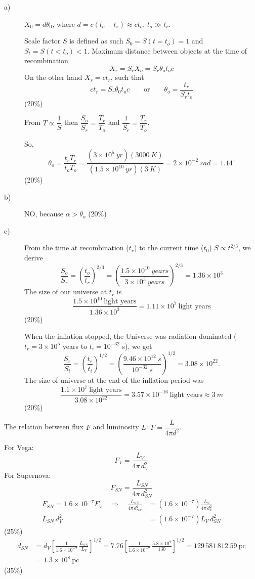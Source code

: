 \begin{description}
\item[a)] $X_0 = d\theta_0$, where $d = c(t_o - t_r) \approx ct_o$,
$t_o \gg t_r$.

Scale factor $S$ is defined as such $S_0 = S(t=t_o) = 1$ and
$S_t = S(t<t_o) < 1$. Maximum distance between objects at the time of
recombination
\[
X_r = S_r X_o = S_r \theta_o t_o c
\]
On the other hand $X_r = ct_r$, such that
\[
ct_r = S_r\theta_0 t_o c
\qquad\text{or}\qquad
\theta_o = \frac{t_r}{S_r t_o}
\]
\hfill(20\%)

From $T \propto \dfrac{1}{S}$ then
$\dfrac{S_o}{S_r} = \dfrac{T_r}{T_o}$ and
$\dfrac{1}{S_r} = \dfrac{T_r}{T_o}$.

So,
\[
\theta_o = \frac{t_r T_r}{t_o T_o}
= \frac{(3\times10^{5}\ yr)(3000\ K)}{(1.5\times10^{10}\ yr)(3\ K)}
= 2\times10^{-2}\ rad = 1.14^\circ
\]
\hfill(20\%)

\item[b)] NO, because $\alpha > \theta_o$
\hfill(20\%)

\item[c)]
From the time at recombination ($t_r$) to the current time ($t_0$)
$S \propto t^{2/3}$, we derive
\[
\frac{S_o}{S_r} = \left(\frac{t_o}{t_r}\right)^{2/3}
= \left(\frac{1.5\times10^{10}\ years}{3\times10^{5}\ years}\right)^{2/3}
= 1.36\times10^{3}
\]
The size of our universe at $t_r$ is
\[
\frac{1.5\times10^{10}\ \text{light years}}{1.36\times10^{3}}
= 1.11\times10^{7}\ \text{light years}
\]
\hfill(20\%)

When the inflation stopped, the Universe was radiation dominated
($t_r = 3\times10^{5}$ years to $t_i = 10^{-32}$ s), we get
\[
\frac{S_r}{S_i} = \left(\frac{t_r}{t_i}\right)^{1/2}
= \left(\frac{9.46\times10^{12}\ s}{10^{-32}\ s}\right)^{1/2}
= 3.08\times10^{22}.
\]
The size of universe at the end of the inflation period was
\[
\frac{1.1\times10^{7}\ \text{light years}}{3.08\times10^{22}}
= 3.57\times10^{-16}\ \text{light years} \approx 3\ m
\]
\hfill(20\%)
\end{description}

The relation between flux $F$ and luminosity $L$:
$F = \dfrac{L}{4\pi d^2}$.

For Vega:
\[
F_V = \frac{L_V}{4\pi\,d_V^2}
\]
For Supernova:
\[
F_{SN} = \frac{L_{SN}}{4\pi\,d_{SN}^2}
\]
\begin{align*}
F_{SN} = 1.6\times10^{-7}F_V
\quad\Longrightarrow\quad
\frac{L_{SN}}{4\pi\,d_{SN}^2}
  &= \left(1.6\times10^{-7}\right)\frac{L_V}{4\pi\,d_V^2}\\
L_{SN}\,d_V^2 &= \left(1.6\times10^{-7}\right)L_V\,d_{SN}^2
\end{align*}
\hfill(25\%)
\begin{align*}
d_{SN} &= d_V\left[\frac{1}{1.6\times10^{-7}}\,
  \frac{L_{SN}}{L_V}\right]^{1/2}
= 7.76\left[\frac{1}{1.6\times10^{-7}}\,
  \frac{5.8\times10^{9}}{130}\right]^{1/2}
= 129\,581\,812.59\ \mathrm{pc}\\
&= 1.3\times10^{8}\ \mathrm{pc}
\end{align*}
\hfill(35\%)

